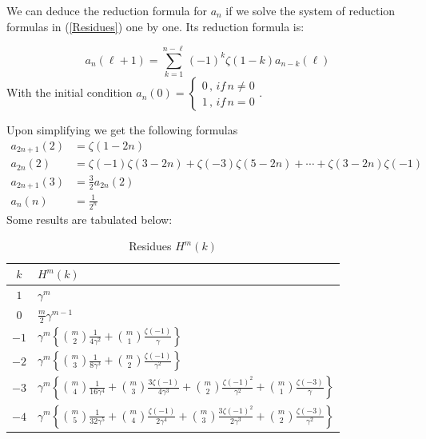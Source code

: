 \documentclass{article}
\begin{document}
We can deduce the reduction formula for $a_n$ if we solve the system of reduction formulas in (\ref{Residues}) one by one. Its reduction formula is:

\begin{equation}\label{reduction of an}
    a_{n}(\ell +1)=\sum_{k=1}^{n-\ell} (-1)^k \zeta(1-k)a_{n-k}(\ell)
\end{equation}
With the initial condition $a_n(0)=\begin{cases} 0\, , \, if \, n\neq 0 \\ 1 \, , \, if \, n=0    
\end{cases}$. \

Upon simplifying we get the following formulas
\begin{align}
    a_{2n+1}(2)&=\zeta(1-2n) \\
    a_{2n}(2) & =\zeta(-1)\zeta(3-2n)+\zeta(-3)\zeta(5-2n)+\cdots +\zeta(3-2n)\zeta(-1)\\
    a_{2n+1}(3)& =\frac{3}{2}a_{2n}(2)\\
    a_{n}(n) &=\frac{1}{2^n}
\end{align} Some results are tabulated below:

\begin{table}[h]\caption{Residues $H^m(k)$}\vspace{3mm}\label{tab2}
\begin{tabular}{| c |l |} \hline 
$k$  & $H^m(k)$  \\ 
 \hline
$1$ & $ \gamma^m$  \\    \hline
$0$ & $ \frac{m}{2}\gamma^{m-1}$ \\  \hline
$-1$ & $ \gamma^m\left\{\binom{m}{2}\frac{1}{4\gamma^2 }+\binom{m}{1}\frac{\zeta(-1)}{\gamma}\right\}$ \\   \hline
$-2$ & $ \gamma^m \left\{\binom{m}{3}\frac{1}{8 \gamma^3}+\binom{m}{2}\frac{\zeta(-1)}{\gamma^2}\right\}$ \\ \hline
$-3$ & $ \gamma^m \left\{\binom{m}{4}\frac{1}{16 \gamma^4}+\binom{m}{3}\frac{3 \zeta(-1)}{4 \gamma^3}+\binom{m}{2}\frac{\zeta(-1)^2}{\gamma^2}+\binom{m}{1}\frac{\zeta(-3)}{\gamma}\right\}$ \\  \hline
$-4$ & $ \gamma^m \left\{\binom{m}{5}\frac{1}{32 \gamma^5}+\binom{m}{4}\frac{\zeta(-1)}{2\gamma^4}+\binom{m}{3}\frac{3\zeta(-1)^2}{2\gamma^3}+\binom{m}{2}\frac{\zeta(-3)}{\gamma^2}\right\}$ \\ \hline \end{tabular}
\end{table}
\end{document}
